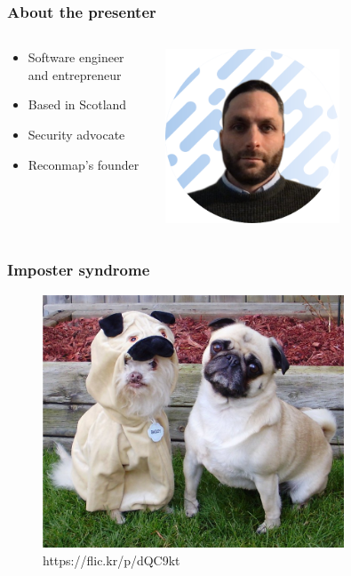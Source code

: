 \documentclass{beamer}
\begin{document}
\begin{frame}
    \frametitle{About the presenter}
    
    \note[item]{
    }

	\begin{columns}
		\begin{column}{0.5\textwidth}
	    \begin{itemize}
	    		\item Software engineer and entrepreneur
	    		\item Based in Scotland
	    		\item Security advocate
	    		\item Reconmap's founder
	    \end{itemize}
		\end{column}

		\begin{column}{0.5\textwidth}
		\includegraphics[width=0.6\textwidth]{santiago-lizardo-presenter.png}
		\end{column}
	\end{columns}
\end{frame}

\begin{frame}
    \frametitle{Imposter syndrome}
    
    	\begin{figure}[h]
	\centering
	\includegraphics[width=0.8\textwidth]{imposter-syndrome.jpg}
	\caption{https://flic.kr/p/dQC9kt}
	\end{figure}
\end{frame}
\end{document}
